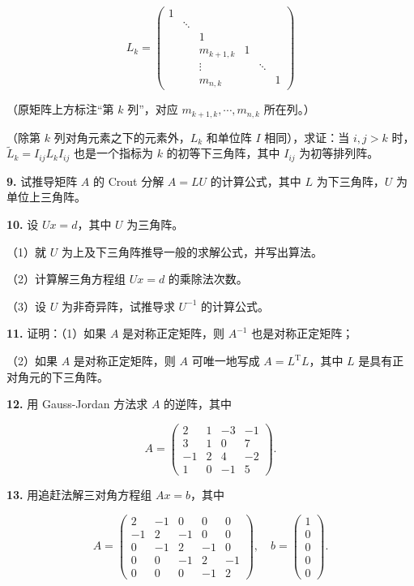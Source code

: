 \[
L_k=\begin{pmatrix}
1&&&&&\\
&\ddots&&&&\\
&&1&&&\\
&&m_{k+1,k}&1&&\\
&&\vdots&&\ddots&\\
&&m_{n,k}&&&1
\end{pmatrix}
\]

（原矩阵上方标注``第 \(k\) 列''，对应 \(m_{k+1,k},\cdots,m_{n,k}\) 所在列。）

（除第 \(k\) 列对角元素之下的元素外，\(L_k\) 和单位阵 \(I\) 相同），求证：当 \(i,j>k\) 时，\(\widetilde L_k=I_{ij}L_kI_{ij}\) 也是一个指标为 \(k\) 的初等下三角阵，其中 \(I_{ij}\) 为初等排列阵。

\textbf{9.} 试推导矩阵 \(A\) 的 Crout 分解 \(A=LU\) 的计算公式，其中 \(L\) 为下三角阵，\(U\) 为单位上三角阵。

\textbf{10.} 设 \(Ux=d\)，其中 \(U\) 为三角阵。

（1）就 \(U\) 为上及下三角阵推导一般的求解公式，并写出算法。

（2）计算解三角方程组 \(Ux=d\) 的乘除法次数。

（3）设 \(U\) 为非奇异阵，试推导求 \(U^{-1}\) 的计算公式。

\textbf{11.} 证明：（1）如果 \(A\) 是对称正定矩阵，则 \(A^{-1}\) 也是对称正定矩阵；

（2）如果 \(A\) 是对称正定矩阵，则 \(A\) 可唯一地写成 \(A=L^{\mathrm T}L\)，其中 \(L\) 是具有正对角元的下三角阵。

\textbf{12.} 用 Gauss-Jordan 方法求 \(A\) 的逆阵，其中

\[
A=\begin{pmatrix}
2&1&-3&-1\\
3&1&0&7\\
-1&2&4&-2\\
1&0&-1&5
\end{pmatrix}.
\]

\textbf{13.} 用追赶法解三对角方程组 \(Ax=b\)，其中

\[
A=\begin{pmatrix}
2&-1&0&0&0\\
-1&2&-1&0&0\\
0&-1&2&-1&0\\
0&0&-1&2&-1\\
0&0&0&-1&2
\end{pmatrix},\quad
b=\begin{pmatrix}1\\0\\0\\0\\0\end{pmatrix}.
\]

